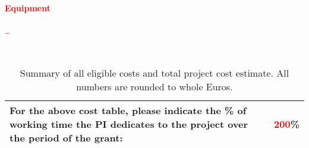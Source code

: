 \textcolor{red}{\blindtext[1]}

\paragraph{\textcolor{red}{Equipment}}

\textcolor{red}{\blindtext[2]}

\textcolor{red}{\ldots}


\begin{table}[h]
\begin{center}
\\[0.8cm]

\setlength{\arrayrulewidth}{1.35pt}
\def\arraystretch{1.5}
\begin{tabular}{|p{0.634\hsize}|C{0.108\hsize}|}
\hline
\textbf{For the above cost table, please indicate the \% of working time
the PI dedicates to the project over the period of the grant:}
& \textbf{\textcolor{red}{200}\%}\\
\hline
\end{tabular}
\caption{Summary of all eligible costs and total project cost estimate. All numbers are rounded to
whole Euros.}
\label{tab:budget}
\end{center}
\end{table}



\nocite{*} %

\renewcommand\bibsection{\section*{\refname}}



